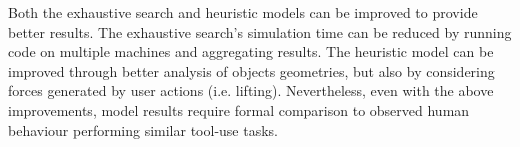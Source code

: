 \documentclass[
    a4paper,
    man,
    donotrepeattitle,
    floatsintext,
    british
]{apa6}
\begin{document}
Both the exhaustive search and heuristic models can be improved to provide better results.
The exhaustive search's simulation time can be reduced by running code on multiple machines and aggregating results.
The heuristic model can be improved through better analysis of objects geometries, but also by considering forces generated by user actions (i.e. lifting).
Nevertheless, even with the above improvements, model results require formal comparison to observed human behaviour performing similar tool-use tasks.  
\clearpage


\shorttitle{}
\printbibliography
\end{document}
